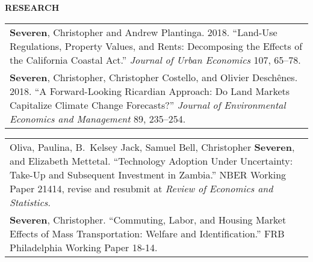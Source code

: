 \documentclass[english, 10pt]{report}
\begin{document}
\vspace{0.2in}

{\bf {RESEARCH}}

{\bf \underline{}}

\begin{longtable}{@{}p{6.5in}}
{\bf Severen}, Christopher and Andrew Plantinga. 2018. ``Land-Use Regulations, Property Values, and Rents: Decomposing the Effects of the California Coastal Act.'' \emph{Journal of Urban Economics} 107, 65--78. \\[1em]
{\bf Severen}, Christopher, Christopher Costello, and Olivier Desch\^{e}nes. 2018. ``A Forward-Looking Ricardian Approach: Do Land Markets Capitalize Climate Change Forecasts?'' \emph{Journal of Environmental Economics and Management} 89, 235--254.  \\
\end{longtable}




\vspace{-0.1in}

{\bf \underline{}}

\begin{longtable}{@{}p{6.5in}}
Oliva, Paulina, B.\ Kelsey Jack, Samuel Bell, Christopher {\bf Severen}, and Elizabeth Mettetal. ``Technology Adoption Under Uncertainty: Take-Up and Subsequent Investment in Zambia.'' NBER Working Paper 21414, revise and resubmit at \emph{Review of Economics and Statistics}.  \\[1em]
{\bf Severen}, Christopher. ``Commuting, Labor, and Housing Market Effects of Mass Transportation: Welfare and Identification.'' FRB Philadelphia Working Paper 18-14. 
\end{longtable}
\end{document}
